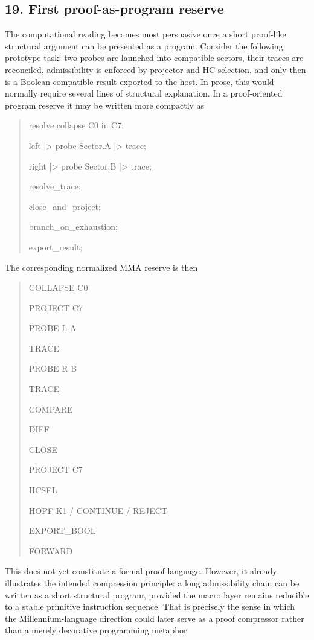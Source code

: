 \subsection*{19. First proof-as-program reserve}
The computational reading becomes most persuasive once a short proof-like structural argument can be presented as a program. Consider the following prototype task: two probes are launched into compatible sectors, their traces are reconciled, admissibility is enforced by projector and HC selection, and only then is a Boolean-compatible result exported to the host. In prose, this would normally require several lines of structural explanation. In a proof-oriented program reserve it may be written more compactly as
\begin{quote}
\ttfamily
resolve collapse C0 in C7;\par
left |> probe Sector.A |> trace;\par
right |> probe Sector.B |> trace;\par
resolve\_trace;\par
close\_and\_project;\par
branch\_on\_exhaustion;\par
export\_result;
\end{quote}
The corresponding normalized MMA reserve is then
\begin{quote}
\ttfamily
COLLAPSE C0 \par
PROJECT C7 \par
PROBE L A \par
TRACE \par
PROBE R B \par
TRACE \par
COMPARE \par
DIFF \par
CLOSE \par
PROJECT C7 \par
HCSEL \par
HOPF K1 / CONTINUE / REJECT \par
EXPORT\_BOOL \par
FORWARD
\end{quote}
This does not yet constitute a formal proof language. However, it already illustrates the intended compression principle: a long admissibility chain can be written as a short structural program, provided the macro layer remains reducible to a stable primitive instruction sequence. That is precisely the sense in which the Millennium-language direction could later serve as a proof compressor rather than a merely decorative programming metaphor.

